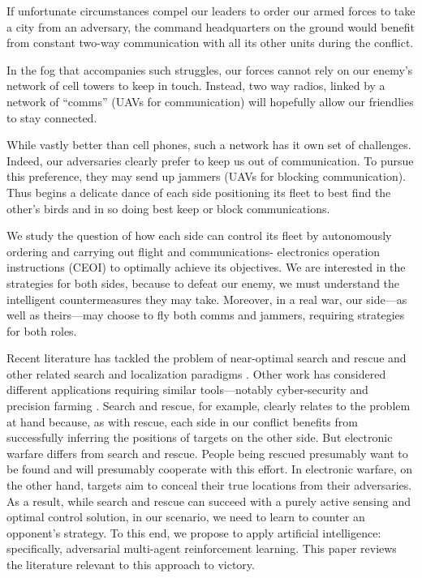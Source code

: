 \documentclass{article}
\begin{document}
If unfortunate circumstances compel our leaders to order our armed
forces to take a city from an adversary, the command headquarters on
the ground would benefit from constant two-way communication with all
its other units during the conflict.

In the fog that accompanies such struggles, our forces cannot rely on
our enemy's network of cell towers to keep in touch.  Instead, two way
radios, linked by a network of ``comms'' (UAVs for communication) will
hopefully allow our friendlies to stay connected.

While vastly better than cell phones, such a network has it own set of
challenges.  Indeed, our adversaries clearly prefer to keep us out of
communication.  To pursue this preference, they may send up jammers
(UAVs for blocking communication).  Thus begins a delicate dance of
each side positioning its fleet to best find the other's birds and in
so doing best keep or block communications.

We study the question of how each side can control its fleet by
autonomously ordering and carrying out flight and communications-
electronics operation instructions (CEOI) to optimally achieve its
objectives.  We are interested in the strategies for both sides,
because to defeat our enemy, we must understand the intelligent
countermeasures they may take. Moreover, in a real war, our side---as
well as theirs---may choose to fly both comms and jammers, requiring
strategies for both roles.

Recent literature has tackled the problem of near-optimal search and
rescue \cite{hoffmann2009mobile} and other related search and
localization paradigms \cite{ryan2010particle, tisdale2008multiple,
  gustafsson2002particle}.  Other work has considered different
applications requiring similar tools---notably cyber-security
\cite{nicholson2007information} and precision farming
\cite{testi2020reinforcement}.  Search and rescue, for example,
clearly relates to the problem at hand because, as with rescue, each
side in our conflict benefits from successfully inferring the
positions of targets on the other side.  But electronic warfare
differs from search and rescue.  People being rescued presumably want
to be found and will presumably cooperate with this effort.  In
electronic warfare, on the other hand, targets aim to conceal their
true locations from their adversaries. As a result, while search and
rescue can succeed with a purely active sensing and optimal control
solution, in our scenario, we need to learn to counter an opponent's
strategy.  To this end, we propose to apply artificial intelligence:
specifically, adversarial multi-agent reinforcement learning. This
paper reviews the literature relevant to this approach to victory.
\end{document}
